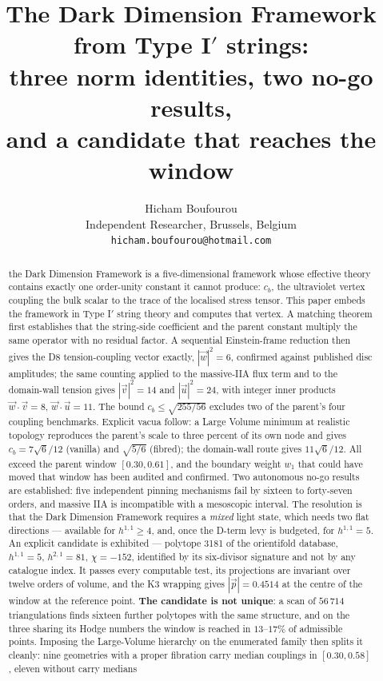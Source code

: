 
\graphicspath{{figures/}{../figures/}}
\title{\bfseries The Dark Dimension Framework from Type I$'$ strings:\\
three norm identities, two no-go results,\\ and a candidate that reaches the window}
\author{Hicham Boufourou\\ \small Independent Researcher, Brussels, Belgium\\ \small\texttt{hicham.boufourou@hotmail.com}}
\maketitle

\begin{abstract}
the Dark Dimension Framework is a five-dimensional framework whose effective theory contains exactly one order-unity constant it cannot produce: $c_b$, the ultraviolet vertex coupling the bulk scalar to the trace of the localised stress tensor. This paper embeds the framework in Type I$'$ string theory and computes that vertex. A matching theorem first establishes that the string-side coefficient and the parent constant multiply the same operator with no residual factor. A sequential Einstein-frame reduction then gives the D8 tension-coupling vector exactly, $|\vec w|^2=6$, confirmed against published disc amplitudes; the same counting applied to the massive-IIA flux term and to the domain-wall tension gives $|\vec v|^2=14$ and $|\vec u|^2=24$, with integer inner products $\vec w\cdot\vec v=8$, $\vec w\cdot\vec u=11$. The bound $c_b\leq\sqrt{255/56}$ excludes two of the parent's four coupling benchmarks. Explicit vacua follow: a Large Volume minimum at realistic topology reproduces the parent's scale to three percent of its own node and gives $c_b=7\sqrt6/12$ (vanilla) and $\sqrt{5/6}$ (fibred); the domain-wall route gives $11\sqrt6/12$. All exceed the parent window $[0.30,0.61]$, and the boundary weight $w_1$ that could have moved that window has been audited and confirmed. Two autonomous no-go results are established: five independent pinning mechanisms fail by sixteen to forty-seven orders, and massive IIA is incompatible with a mesoscopic interval. The resolution is that the Dark Dimension Framework requires a \emph{mixed} light state, which needs two flat directions --- available for $h^{1,1}\geq4$, and, once the D-term levy is budgeted, for $h^{1,1}=5$. An explicit candidate is exhibited --- polytope 3181 of the orientifold database, $h^{1,1}=5$, $h^{2,1}=81$, $\chi=-152$, identified by its six-divisor signature and not by any catalogue index. It passes every computable test, its projections are invariant over twelve orders of volume, and the K3 wrapping gives $|\vec p|=0.4514$ at the centre of the window at the reference point. \textbf{The candidate is not unique}: a scan of $56\,714$ triangulations finds sixteen further polytopes with the same structure, and on the three sharing its Hodge numbers the window is reached in $13$--$17\%$ of admissible points. Imposing the Large-Volume hierarchy on the enumerated family then splits it cleanly: nine geometries with a proper fibration carry median couplings in $[0.30,0.58]$, eleven without carry medians 
\end{abstract}
